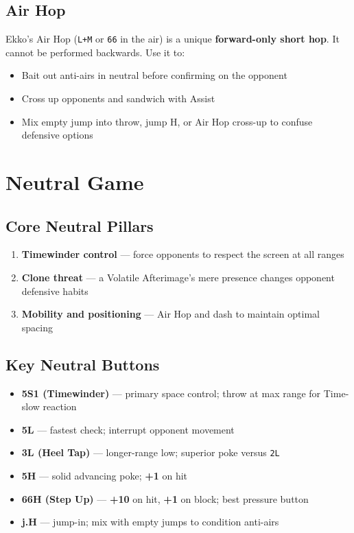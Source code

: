 \documentclass[12pt, a4paper]{report}
\newcommand{\notation}[1]{{\small\texttt{\textcolor{ekkoBlue}{#1}}}}
\newcommand{\movename}[1]{\textbf{\textcolor{ekkoGold}{#1}}}
\newcommand{\advantage}[1]{\textcolor{ekkoGreen}{\textbf{#1}}}
\begin{document}
\section{Air Hop}

Ekko's Air Hop (\notation{L+M} or \notation{66} in the air) is a unique \textbf{forward-only short hop}. It cannot be performed backwards. Use it to:
\begin{itemize}
  \item Bait out anti-airs in neutral before confirming on the opponent
  \item Cross up opponents and sandwich with Assist
  \item Mix empty jump into throw, jump H, or Air Hop cross-up to confuse defensive options
\end{itemize}

\chapter{Neutral Game}

\section{Core Neutral Pillars}

\begin{enumerate}
  \item \textbf{Timewinder control} --- force opponents to respect the screen at all ranges
  \item \textbf{Clone threat} --- a Volatile Afterimage's mere presence changes opponent defensive habits
  \item \textbf{Mobility and positioning} --- Air Hop and dash to maintain optimal spacing
\end{enumerate}

\section{Key Neutral Buttons}

\begin{itemize}
  \item \movename{5S1 (Timewinder)} --- primary space control; throw at max range for Time-slow reaction
  \item \movename{5L} --- fastest check; interrupt opponent movement
  \item \movename{3L (Heel Tap)} --- longer-range low; superior poke versus \notation{2L}
  \item \movename{5H} --- solid advancing poke; \advantage{+1} on hit
  \item \movename{66H (Step Up)} --- \advantage{+10} on hit, \advantage{+1} on block; best pressure button
  \item \movename{j.H} --- jump-in; mix with empty jumps to condition anti-airs
\end{itemize}
\end{document}
